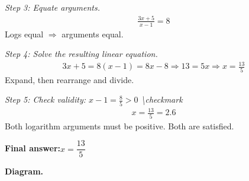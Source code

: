 \documentclass[11pt]{article}
\begin{document}
\textit{Step 3: Equate arguments.}
\[\begin{gathered}
\frac{3x+5}{x-1} = 8
\end{gathered}\]
Logs equal $\Rightarrow$ arguments equal.

\textit{Step 4: Solve the resulting linear equation.}
\[\begin{gathered}
3x + 5 = 8(x-1) = 8x - 8 \Rightarrow 13 = 5x \Rightarrow x = \frac{13}{5}
\end{gathered}\]
Expand, then rearrange and divide.

\textit{Step 5: Check validity: \( x - 1 = \frac{8}{5} > 0 \) \textbackslash checkmark}
\[\begin{gathered}
x = \frac{13}{5} = 2.6
\end{gathered}\]
Both logarithm arguments must be positive. Both are satisfied.

\begin{answerbox}
\textbf{Final answer:}\quad \(\displaystyle  x = \dfrac{13}{5} \)
\end{answerbox}
\textbf{Diagram.}
\end{document}
